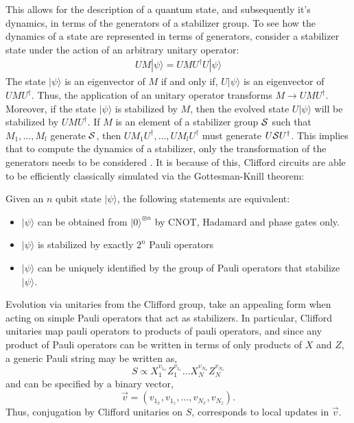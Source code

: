 This allows for the description of a quantum state, and subsequently it's dynamics, in terms of the generators
of a stabilizer group. To see how the dynamics of a state are represented in terms of generators, consider
a stabilizer state under the action of an arbitrary unitary operator:
\begin{align}
    UM|\psi \rangle =  UMU^{\dagger}U|\psi\rangle
\end{align}
The state $|\psi \rangle$ is an eigenvector of $M$ if and only if, $U |\psi\rangle$ is an
eigenvector of $UMU^{\dagger}$. Thus, the application of an unitary operator transforms
$M \to UMU^{\dagger}$. Moreover, if the state $|\psi \rangle$ is stabilized by $M$, then the evolved
state $U|\psi\rangle$ will be stabilized by $UMU^{\dagger}$. If $M$ is an element of a stabilizer group
$\cal S$ such that $M_1, \dots, M_l$ generate $\cal S$, then $UM_1U^{\dagger}, \dots, UM_lU^{\dagger}$ must generate
$U{\cal S}U^{\dagger}$. This implies that to compute the dynamics of a stabilizer, only the transformation of
the generators needs to be considered \cite{fault-tolerantQC}. It is because of this,
Clifford circuits are able to be efficiently classically simulated via the Gottesman-Knill theorem:
\begin{theorem}

    Given an $n$ qubit state $|\psi \rangle$, the following statements are equivalent:
    \begin{itemize}
        \item $|\psi \rangle$ can be obtained from $|0 \rangle^{\otimes n}$ by CNOT, Hadamard and phase gates only.
        \item $|\psi \rangle$ is stabilized by exactly $2^n$ Pauli operators
        \item $|\psi \rangle$ can be uniquely identified by the group of Pauli operators that
              stabilize $|\psi \rangle$.
    \end{itemize}
\end{theorem}
Evolution via unitaries from the Clifford group, take an appealing form when acting on simple Pauli operators that act as stabilizers.
In particular, Clifford unitaries map pauli operators to products of pauli operators, and since any product of Pauli operators
can be written in terms of only products of $X$ and $Z$, a generic Pauli string may be written as,
\begin{equation}
    S \propto X_1^{v_{1_x}}Z^{v_{1_z}}_1 \dots X_N^{v_{N_x}}Z^{v_{N_z}}_N
\end{equation}
and can be specified by a binary vector,
\begin{equation}
    \vec{v} = (v_{1_x},  v_{1_z}, \dots, v_{N_x}, v_{N_z}).
\end{equation}
Thus, conjugation by Clifford unitaries on $S$, corresponds to local updates in $\vec{v}$.

